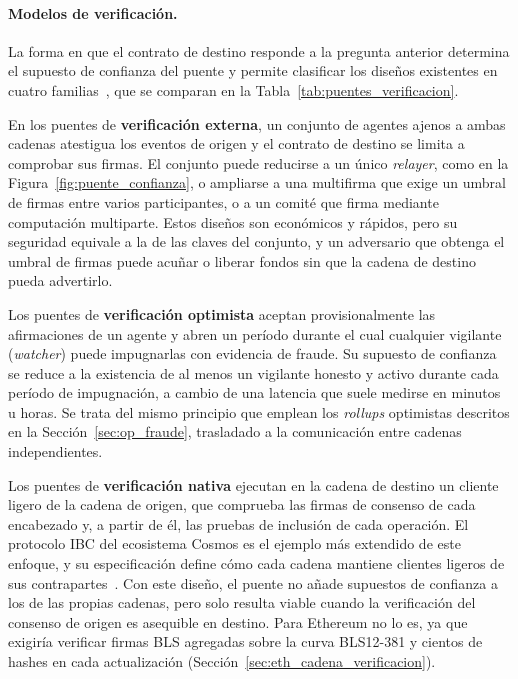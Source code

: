\paragraph{Modelos de verificación.} La forma en que el contrato de destino responde a la
pregunta anterior determina el supuesto de confianza del puente y permite clasificar los diseños
existentes en cuatro familias~\cite{zhang2023bridgesok, belchior2021survey}, que se comparan en la
Tabla~\ref{tab:puentes_verificacion}.

En los puentes de \textbf{verificación externa}, un conjunto de agentes ajenos a ambas cadenas
atestigua los eventos de origen y el contrato de destino se limita a comprobar sus firmas. El
conjunto puede reducirse a un único \textit{relayer}, como en la Figura~\ref{fig:puente_confianza},
o ampliarse a una multifirma que exige un umbral de firmas entre varios participantes, o a un comité que firma mediante
computación multiparte. Estos diseños son económicos y rápidos, pero su seguridad equivale a la
de las claves del conjunto, y un adversario que obtenga el umbral de firmas puede acuñar o
liberar fondos sin que la cadena de destino pueda advertirlo.

Los puentes de \textbf{verificación optimista} aceptan provisionalmente las afirmaciones de un
agente y abren un período durante el cual cualquier vigilante (\textit{watcher}) puede impugnarlas
con evidencia de fraude. Su supuesto de confianza se reduce a la existencia de al menos un
vigilante honesto y activo durante cada período de impugnación, a cambio de una latencia que suele
medirse en minutos u horas. Se trata del mismo principio que emplean los \textit{rollups}
optimistas descritos en la Sección~\ref{sec:op_fraude}, trasladado a la comunicación entre cadenas
independientes.

Los puentes de \textbf{verificación nativa} ejecutan en la cadena de destino un cliente ligero de
la cadena de origen, que comprueba las firmas de consenso de cada encabezado y, a partir de él, las
pruebas de inclusión de cada operación. El protocolo IBC del ecosistema Cosmos es el ejemplo más
extendido de este enfoque, y su especificación define cómo cada cadena mantiene clientes ligeros
de sus contrapartes~\cite{ibcics02}. Con este diseño, el puente no añade supuestos de confianza
a los de las propias cadenas, pero solo resulta viable cuando la verificación del consenso de
origen es asequible en destino. Para Ethereum no lo es, ya que exigiría verificar firmas BLS
agregadas sobre la curva BLS12-381 y cientos de hashes en cada actualización
(Sección~\ref{sec:eth_cadena_verificacion}).

